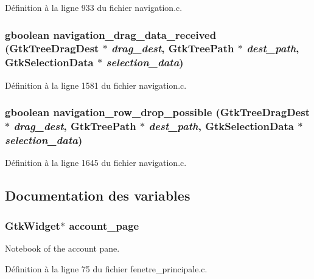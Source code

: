 Définition à la ligne 933 du fichier navigation.c.

\subsubsection[{navigation\_\-drag\_\-data\_\-received}]{\setlength{\rightskip}{0pt plus 5cm}gboolean navigation\_\-drag\_\-data\_\-received (GtkTreeDragDest $\ast$ {\em drag\_\-dest}, \/  GtkTreePath $\ast$ {\em dest\_\-path}, \/  GtkSelectionData $\ast$ {\em selection\_\-data})}\label{navigation_8c_a788a6af93e112548ce10da6c6c6cb9b6}


Définition à la ligne 1581 du fichier navigation.c.

\subsubsection[{navigation\_\-row\_\-drop\_\-possible}]{\setlength{\rightskip}{0pt plus 5cm}gboolean navigation\_\-row\_\-drop\_\-possible (GtkTreeDragDest $\ast$ {\em drag\_\-dest}, \/  GtkTreePath $\ast$ {\em dest\_\-path}, \/  GtkSelectionData $\ast$ {\em selection\_\-data})}\label{navigation_8c_adf246197990d5637d92d86667f1441fa}


Définition à la ligne 1645 du fichier navigation.c.



\subsection{Documentation des variables}
\subsubsection[{account\_\-page}]{\setlength{\rightskip}{0pt plus 5cm}GtkWidget$\ast$ {\bf account\_\-page}}\label{navigation_8c_ad5443d986a9ab5d64dd84c5346c4b87c}
Notebook of the account pane. 

Définition à la ligne 75 du fichier fenetre\_\-principale.c.


